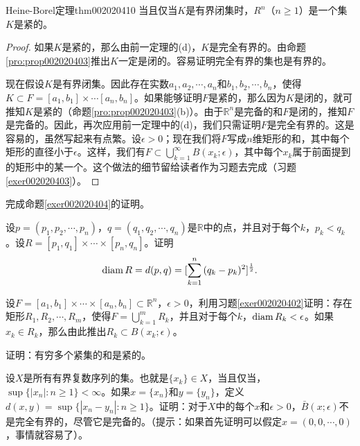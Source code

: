 \begin{theorem}{Heine-Borel定理}{thm002020410}
当且仅当$K$是有界闭集时，$R^{n}$（$n \ge 1$）是一个集$K$是紧的。
\end{theorem}

\begin{proof}
如果$K$是紧的，那么由前一定理的(d)，$K$是完全有界的。由命题\ref{pro:prop002020403}推出$K$一定是闭的。容易证明完全有界的集也是有界的。

现在假设$K$是有界闭集。因此存在实数$a_1,a_2,\cdots,a_n$和$b_1,b_2,\cdots,b_n$，使得$K \subset F = [a_1, b_1] \times \cdots [a_n, b_n]$。如果能够证明$F$是紧的，那么因为$K$是闭的，就可推知$K$是紧的（命题\ref{pro:prop002020403}(b)）。由于$\mathbb{R}^n$是完备的和$F$是闭的，推知$F$是完备的。因此，再次应用前一定理中的(d)，我们只需证明$F$是完全有界的。这是容易的，虽然写起来有点繁。设$\epsilon > 0$；现在我们将$F$写成$n$维矩形的和，其中每个矩形的直径小于$\epsilon$。这样，我们有$F \subset \bigcup_{k=1}^{\infty}{B(x_k; \epsilon)}$，其中每个$x_k$属于前面提到的矩形中的某一个。这个做法的细节留给读者作为习题去完成（习题\ref{exer002020403}）。
\end{proof}

\begin{exercise}
完成命题\ref{exer002020404}的证明。
\end{exercise}

\begin{exercise}\label{exer002020402}
设$p = (p_1,p_2,\cdots, p_n)$，$q = (q_1, q_2, \cdots, q_n)$是$\mathbb{R}$中的点，并且对于每个$k$，$p_k < q_k$。设$R = [p_1, q_1] \times \cdots \times [p_n,q_n]$。证明
\[
\operatorname{diam}{R} = d(p, q) = [\sum_{k=1}^{n}{(q_k - p_k)^2}]^{\frac{1}{2}}.
\]
\end{exercise}

\begin{exercise}\label{exer002020403}
设$F = [a_1, b_1] \times \cdots \times [a_n, b_n] \subset \mathbb{R}^n$，$\epsilon > 0$，利用习题\ref{exer002020402}证明：存在矩形$R_1, R_2, \cdots, R_m$，使得$F = \bigcup_{k=1}^{m}{R_k}$，并且对于每个$k$，$\operatorname{diam}{R_k} < \epsilon$。如果$x_k \in R_k$，那么由此推出$R_k \subset B(x_k; \epsilon)$。
\end{exercise}

\begin{exercise}\label{exer002020404}
证明：有穷多个紧集的和是紧的。
\end{exercise}

\begin{exercise}
设$X$是所有有界复数序列的集。也就是$\{x_k\} \in X$，当且仅当，$\sup\{|x_n|:n \ge 1\} < \infty$。如果$x = \{x_n\}$和$y = \{y_n\}$，定义$d(x, y) = \sup\{|x_n-y_n|: n \ge 1\}$。证明：对于$X$中的每个$x$和$\epsilon > 0$，$\bar{B}(x; \epsilon)$不是完全有界的，尽管它是完备的。（提示：如果首先证明可以假定$x=(0, 0, \cdots, 0)$，事情就容易了）。
\end{exercise}

